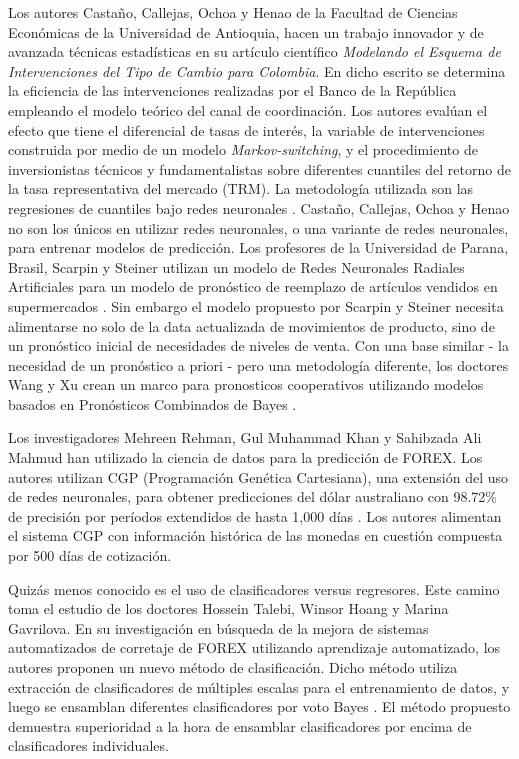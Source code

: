 Los autores Castaño, Callejas, Ochoa y Henao de la Facultad de Ciencias Económicas de la Universidad de Antioquia, hacen un trabajo innovador y de avanzada técnicas estadísticas en su artículo científico \emph{Modelando el Esquema de Intervenciones del Tipo de Cambio para Colombia}. En dicho escrito se determina la eficiencia de las intervenciones realizadas por el Banco de la República empleando el modelo teórico del canal de coordinación. Los autores evalúan el efecto que tiene el diferencial de tasas de interés, la variable de intervenciones construida por medio de un modelo \emph{Markov-switching}, y el procedimiento de inversionistas técnicos y fundamentalistas sobre diferentes cuantiles del retorno de la tasa representativa del mercado (TRM). La metodología utilizada son las regresiones de cuantiles bajo redes neuronales \cite{modelandoIntervenciones}. Castaño, Callejas, Ochoa y Henao no son los únicos en utilizar redes neuronales, o una variante de redes neuronales, para entrenar modelos de predicción. Los profesores de la Universidad de Parana, Brasil, Scarpin y Steiner utilizan un modelo de Redes Neuronales Radiales Artificiales para un modelo de pronóstico de reemplazo de artículos vendidos en supermercados \cite{scarpinSteiner}. Sin embargo el modelo propuesto por Scarpin y Steiner necesita alimentarse no solo de la data actualizada de movimientos de producto, sino de un pronóstico inicial de necesidades de niveles de venta. Con una base similar - la necesidad de un pronóstico a priori - pero una metodología diferente, los doctores Wang y Xu crean un marco para pronosticos cooperativos utilizando modelos basados en Pronósticos Combinados de Bayes \cite{wangXu}. 
 
Los investigadores Mehreen Rehman, Gul Muhammad Khan y Sahibzada Ali Mahmud han utilizado la ciencia de datos para la predicción de FOREX. Los autores utilizan CGP (Programación Genética Cartesiana), una extensión del uso de redes neuronales, para obtener predicciones del dólar australiano con 98.72\% de precisión por períodos extendidos de hasta 1,000 días \cite{rehmanKhanMahmud}. Los autores alimentan el sistema CGP con información histórica de las monedas en cuestión compuesta por 500 días de cotización.
 
Quizás menos conocido es el uso de clasificadores versus regresores. Este camino toma el estudio de los doctores Hossein Talebi, Winsor Hoang y Marina Gavrilova. En su investigación en búsqueda de la mejora de sistemas automatizados de corretaje de FOREX utilizando aprendizaje automatizado, los autores proponen un nuevo método de clasificación. Dicho método utiliza extracción de clasificadores de múltiples escalas para el entrenamiento de datos, y luego se ensamblan diferentes clasificadores por voto Bayes \cite{talebiHoang}. El método propuesto demuestra superioridad a la hora de ensamblar clasificadores por encima de clasificadores individuales.
 
